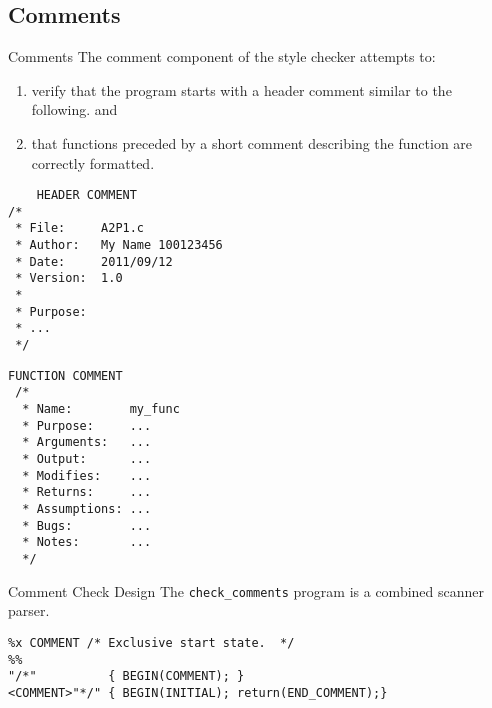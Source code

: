 \documentclass[compress]{beamer}
\begin{document}
\subsection{Comments}
\begin{frame}[containsverbatim]{Comments}
The comment component of the style checker attempts to:
\begin{enumerate}
    \item verify that the program starts with a header comment similar to the following. and 
    \item that functions preceded by a short comment describing the function are correctly formatted.
    \end{enumerate}
\begin{multicols}{2}
\scriptsize{\begin{verbatim}
    HEADER COMMENT 
/*   
 * File:     A2P1.c
 * Author:   My Name 100123456  
 * Date:     2011/09/12  
 * Version:  1.0
 * 
 * Purpose: 
 * ...
 */ 
\end{verbatim}}
\scriptsize{\begin{verbatim}
FUNCTION COMMENT
 /*
  * Name:        my_func
  * Purpose:     ...
  * Arguments:   ...
  * Output:      ...
  * Modifies:    ...
  * Returns:     ...
  * Assumptions: ...
  * Bugs:        ...
  * Notes:       ...
  */
\end{verbatim}}
\end{multicols}
\end{frame}
\begin{frame}[containsverbatim]{Comment Check Design}
The \textcolor{hsrmSec2}{\texttt{check\_comments}} program is a combined scanner parser.
\begin{verbatim}
%x COMMENT /* Exclusive start state.  */
%%
"/*"          { BEGIN(COMMENT); }
<COMMENT>"*/" { BEGIN(INITIAL); return(END_COMMENT);}

\end{verbatim}
\end{frame}


\end{document}

